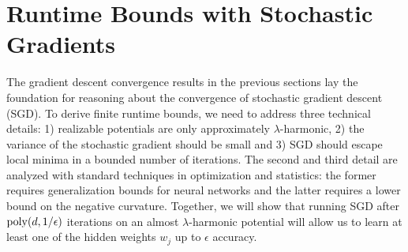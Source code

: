 
\section{Runtime Bounds with Stochastic Gradients}

The gradient descent convergence results in the previous sections lay
the foundation for reasoning about the convergence of stochastic
gradient descent (SGD). To derive finite runtime bounds, we need to
address three technical details: 1) realizable potentials are only
approximately $\lambda$-harmonic, 2) the
variance of the stochastic gradient should be small and 3) SGD should escape local
minima in a bounded number of iterations. The
second and third detail are analyzed with standard techniques in
optimization and statistics: the former requires generalization bounds
for neural networks and the latter requires a lower bound on the
negative curvature. Together, we will show that running SGD after $\mathrm{poly}(d,1/\epsilon)$ iterations on an almost $\lambda$-harmonic potential will allow us to learn at least one of the hidden weights $w_j$ up to $\epsilon$ accuracy.

